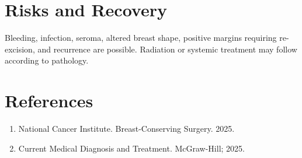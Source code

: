 \section*{Risks and Recovery}
Bleeding, infection, seroma, altered breast shape, positive margins requiring re-excision, and recurrence are possible. Radiation or systemic treatment may follow according to pathology.
\section*{References}
\begin{enumerate}\item National Cancer Institute. Breast-Conserving Surgery. 2025.\item Current Medical Diagnosis and Treatment. McGraw-Hill; 2025.\end{enumerate}
\clearpage
